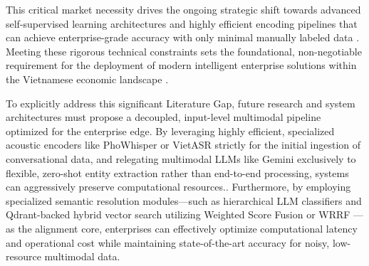 This critical market necessity drives the ongoing strategic shift towards advanced self-supervised learning architectures and highly efficient encoding pipelines that can achieve enterprise-grade accuracy with only minimal manually labeled data \parencite{zhuo2025vietasr}. Meeting these rigorous technical constraints sets the foundational, non-negotiable requirement for the deployment of modern intelligent enterprise solutions within the Vietnamese economic landscape \parencite{sura2025multimodal}.

To explicitly address this significant Literature Gap, future research and system architectures must propose a decoupled, input-level multimodal pipeline optimized for the enterprise edge. By leveraging highly efficient, specialized acoustic encoders like PhoWhisper \parencite{le2024phowhisper} or VietASR \parencite{zhuo2025vietasr} strictly for the initial ingestion of conversational data, and relegating multimodal LLMs like Gemini \parencite{reid2024gemini} exclusively to flexible, zero-shot entity extraction rather than end-to-end processing, systems can aggressively preserve computational resources.. Furthermore, by employing specialized semantic resolution modules—such as hierarchical LLM classifiers and Qdrant-backed \parencite{qdrant} hybrid vector search utilizing Weighted Score Fusion or WRRF \parencite{cormack2009reciprocal}—as the alignment core, enterprises can effectively optimize computational latency and operational cost while maintaining state-of-the-art accuracy for noisy, low-resource multimodal data.





